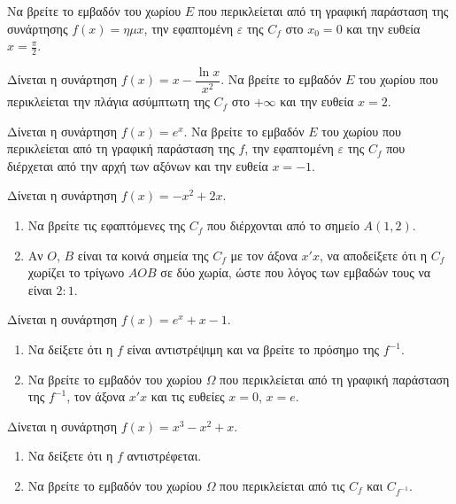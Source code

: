 \documentclass{presentation}
\begin{document}
\begin{askisi}
  Να βρείτε το εμβαδόν του χωρίου $E$ που περικλείεται από τη γραφική παράσταση της συνάρτησης $f(x)=ημx$, την εφαπτομένη $ε$ της $C_f$ στο $x_0=0$ και την ευθεία $x=\frac{π}{2}$.
\end{askisi}

\begin{askisi}
  Δίνεται η συνάρτηση $f(x)=x- \dfrac{\ln x}{x^2}$. Να βρείτε το εμβαδόν $E$ του χωρίου που περικλείεται την πλάγια ασύμπτωτη της $C_f$ στο $+\infty$ και την ευθεία $x=2$.
\end{askisi}

\begin{askisi}
  Δίνεται η συνάρτηση $f(x)=e^x$. Να βρείτε το εμβαδόν $E$ του χωρίου που περικλείεται από τη γραφική παράσταση της $f$, την εφαπτομένη $ε$ της $C_f$ που διέρχεται από την αρχή των αξόνων και την ευθεία $x=-1$.
\end{askisi}

\begin{askisi}
  Δίνεται η συνάρτηση $f(x) = -x^2 + 2x$.
  \begin{enumerate}[<+->]
    \item Να βρείτε τις εφαπτόμενες της $C_f$ που διέρχονται από το σημείο $A(1, 2)$.
    \item Αν $O$, $Β$ είναι τα κοινά σημεία της $C_f$ με τον άξονα $x'x$, να αποδείξετε ότι η $C_f$ χωρίζει το τρίγωνο $AOB$ σε δύο χωρία, ώστε που λόγος των εμβαδών τους να είναι $2:1$.
  \end{enumerate}
\end{askisi}

\begin{askisi}
  Δίνεται η συνάρτηση $f(x) = e^x +x- 1$.
  \begin{enumerate}[<+->]
    \item Να δείξετε ότι η $f$ είναι αντιστρέψιμη και να βρείτε το πρόσημο της $f^{-1}$.
    \item Να βρείτε το εμβαδόν του χωρίου $Ω$ που περικλείεται από τη γραφική παράσταση της $f^{-1}$, τον άξονα $x'x$ και τις ευθείες $x=0$, $x=e$.
  \end{enumerate}
\end{askisi}


\begin{askisi}
  Δίνεται η συνάρτηση $f(x)=x^3-x^2+x$.
  \begin{enumerate}[<+->]
    \item Να δείξετε ότι η $f$ αντιστρέφεται.
    \item Να βρείτε το εμβαδόν του χωρίου $Ω$ που περικλείεται από τις $C_f$ και $C_{f^{-1}}$.
  \end{enumerate}
\end{askisi}
\end{document}
